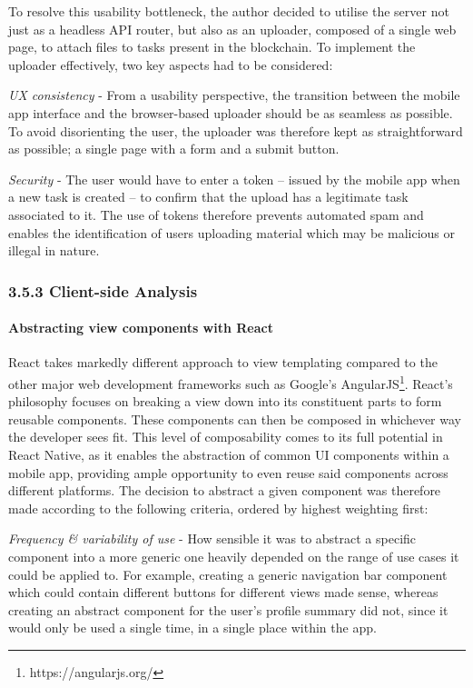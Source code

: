 \documentclass[12pt]{report}
\let\oldparagraph\paragraph
\renewcommand{\paragraph}[1]{\oldparagraph{#1}\mbox{}}
\begin{document}
To resolve this usability bottleneck, the author decided to utilise the
server not just as a headless API router, but also as an uploader,
composed of a single web page, to attach files to tasks present in the
blockchain. To implement the uploader effectively, two key aspects had
to be considered:

\emph{UX consistency} - From a usability perspective, the transition
between the mobile app interface and the browser-based uploader should
be as seamless as possible. To avoid disorienting the user, the uploader
was therefore kept as straightforward as possible; a single page with a
form and a submit button.

\emph{Security} - The user would have to enter a token -- issued by the
mobile app when a new task is created -- to confirm that the upload has
a legitimate task associated to it. The use of tokens therefore prevents
automated spam and enables the identification of users uploading
material which may be malicious or illegal in nature.

\subsubsection{3.5.3 Client-side Analysis}\label{client-side-analysis}

\paragraph{Abstracting view components with
React}\label{abstracting-view-components-with-react}

React takes markedly different approach to view templating compared to
the other major web development frameworks such as Google's
AngularJS\footnote{https://angularjs.org/}. React's philosophy
focuses on breaking a view down into its constituent parts to form
reusable components. These components can then be composed in whichever
way the developer sees fit. This level of composability comes to its
full potential in React Native, as it enables the abstraction of common
UI components within a mobile app, providing ample opportunity to even
reuse said components across different platforms. The decision to
abstract a given component was therefore made according to the following
criteria, ordered by highest weighting first:

\emph{Frequency \& variability of use} - How sensible it was to abstract
a specific component into a more generic one heavily depended on the
range of use cases it could be applied to. For example, creating a
generic navigation bar component which could contain different buttons
for different views made sense, whereas creating an abstract component
for the user's profile summary did not, since it would only be used a
single time, in a single place within the app.
\end{document}
